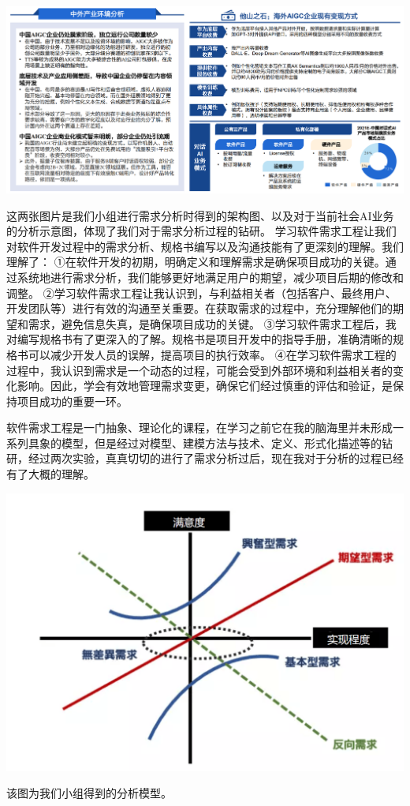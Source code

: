 \documentclass[11pt, a4paper, oneside]{ctexbook}
\begin{document}
  
\begin{center}
  \begin{minipage}{\textwidth}
    \center
    \includegraphics[width=\textwidth]{6.png}
    \captionsetup{hypcap=false}
    \label{fig:6}
  \end{minipage}
\end{center}
这两张图片是我们小组进行需求分析时得到的架构图、以及对于当前社会AI业务的分析示意图，体现了我们对于需求分析过程的钻研。
学习软件需求工程让我们对软件开发过程中的需求分析、规格书编写以及沟通技能有了更深刻的理解。我们理解了：
①在软件开发的初期，明确定义和理解需求是确保项目成功的关键。通过系统地进行需求分析，我们能够更好地满足用户的期望，减少项目后期的修改和调整。
②学习软件需求工程让我认识到，与利益相关者（包括客户、最终用户、开发团队等）进行有效的沟通至关重要。在获取需求的过程中，充分理解他们的期望和需求，避免信息失真，是确保项目成功的关键。
③学习软件需求工程后，我对编写规格书有了更深入的了解。规格书是项目开发中的指导手册，准确清晰的规格书可以减少开发人员的误解，提高项目的执行效率。
④在学习软件需求工程的过程中，我认识到需求是一个动态的过程，可能会受到外部环境和利益相关者的变化影响。因此，学会有效地管理需求变更，确保它们经过慎重的评估和验证，是保持项目成功的重要一环。

软件需求工程是一门抽象、理论化的课程，在学习之前它在我的脑海里并未形成一系列具象的模型，但是经过对模型、建模方法与技术、定义、形式化描述等的钻研，经过两次实验，真真切切的进行了需求分析过后，现在我对于分析的过程已经有了大概的理解。
 
\begin{center}
  \begin{minipage}{\textwidth}
    \center
    \includegraphics[width=\textwidth]{分析模型.png}
    \captionsetup{hypcap=false}
    \label{fig:7}
  \end{minipage}
\end{center}

该图为我们小组得到的分析模型。
\end{document}
